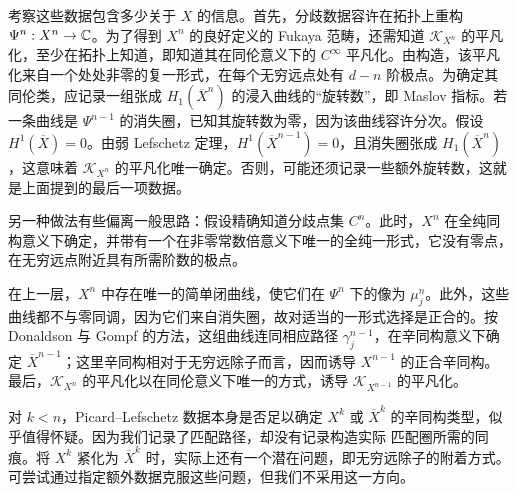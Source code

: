 考察这些数据包含多少关于 $X$ 的信息。首先，分歧数据容许在拓扑上重构 $\Psi^n:X^n\to\mathbb C$。为了得到 $X^n$ 的良好定义的 Fukaya 范畴，还需知道 $\mathcal K_{X^n}$ 的平凡化，至少在拓扑上知道，即知道其在同伦意义下的 $C^\infty$ 平凡化。由构造，该平凡化来自一个处处非零的复一形式，在每个无穷远点处有 $d-n$ 阶极点。为确定其同伦类，应记录一组张成 $H_1(\overline X^n)$ 的浸入曲线的“旋转数”，即 Maslov 指标。若一条曲线是 $\Psi^{n-1}$ 的消失圈，已知其旋转数为零，因为该曲线容许分次。假设 $H^1(\overline X)=0$。由弱 Lefschetz 定理，$H^1(\overline X^{n-1})=0$，且消失圈张成 $H_1(\overline X^n)$，这意味着 $\mathcal K_{X^n}$ 的平凡化唯一确定。否则，可能还须记录一些额外旋转数，这就是上面提到的最后一项数据。

\begin{note}\label{st:19.9}
另一种做法有些偏离一般思路：假设精确知道分歧点集 $C^n$。此时，$X^n$ 在全纯同构意义下确定，并带有一个在非零常数倍意义下唯一的全纯一形式，它没有零点，在无穷远点附近具有所需阶数的极点。
\end{note}

在上一层，$X^n$ 中存在唯一的简单闭曲线，使它们在 $\Psi^n$ 下的像为 $\mu_j^n$。此外，这些曲线都不与零同调，因为它们来自消失圈，故对适当的一形式选择是正合的。按 Donaldson 与 Gompf 的方法，这组曲线连同相应路径 $\gamma_j^{n-1}$，在辛同构意义下确定 $\overline X^{n-1}$；这里辛同构相对于无穷远除子而言，因而诱导 $X^{n-1}$ 的正合辛同构。最后，$\mathcal K_{X^n}$ 的平凡化以在同伦意义下唯一的方式，诱导 $\mathcal K_{X^{n-1}}$ 的平凡化。

对 $k<n$，Picard--Lefschetz 数据本身是否足以确定 $X^k$ 或 $\overline X^k$ 的辛同构类型，似乎值得怀疑。因为我们记录了匹配路径，却没有记录构造实际
匹配圈所需的同痕。将 $X^k$ 紧化为 $\overline X^k$ 时，实际上还有一个潜在问题，即无穷远除子的附着方式。可尝试通过指定额外数据克服这些问题，但我们不采用这一方向。

